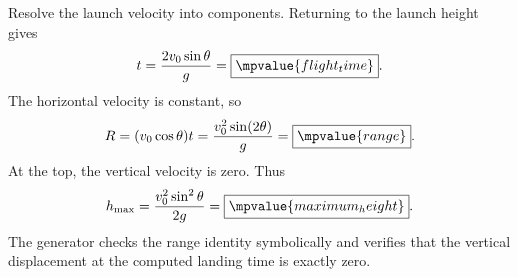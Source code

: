 Resolve the launch velocity into components. Returning to the launch height gives
\[
  t=\frac{2v_0\sin\theta}{g}=\boxed{\mpvalue{flight_time}}.
\]
The horizontal velocity is constant, so
\[
  R=(v_0\cos\theta)t
   =\frac{v_0^2\sin(2\theta)}{g}
   =\boxed{\mpvalue{range}}.
\]
At the top, the vertical velocity is zero. Thus
\[
  h_{\max}=\frac{v_0^2\sin^2\theta}{2g}
  =\boxed{\mpvalue{maximum_height}}.
\]
The generator checks the range identity symbolically and verifies that the vertical displacement
at the computed landing time is exactly zero.
